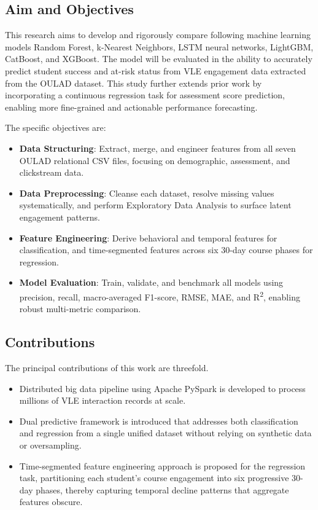 \documentclass[conference]{IEEEtran}
\begin{document}
\subsection{Aim and Objectives}
This research aims to develop and rigorously compare following machine learning models Random Forest, k-Nearest Neighbors, LSTM neural networks, LightGBM, CatBoost, and XGBoost. The model will be evaluated in the ability to accurately predict student success and at-risk status from VLE engagement data extracted from the OULAD dataset. This study further extends prior work by incorporating a continuous regression task for assessment score prediction, enabling more fine-grained and actionable performance forecasting.

The specific objectives are:
\begin{itemize}
    \item \textbf{Data Structuring}: Extract, merge, and engineer features from all seven OULAD relational CSV files, focusing on demographic, assessment, and clickstream data.
    \item \textbf{Data Preprocessing}: Cleanse each dataset, resolve missing values systematically, and perform Exploratory Data Analysis to surface latent engagement patterns.
    \item \textbf{Feature Engineering}: Derive behavioral and temporal features for classification, and time-segmented features across six 30-day course phases for regression.
    \item \textbf{Model Evaluation}: Train, validate, and benchmark all models using precision, recall, macro-averaged F1-score, RMSE, MAE, and R\textsuperscript{2}, enabling robust multi-metric comparison.
\end{itemize}

\subsection{Contributions}
The principal contributions of this work are threefold.

\begin{itemize}
    \item Distributed big data pipeline using Apache PySpark is developed to process millions of VLE interaction records at scale.
    \item Dual predictive framework is introduced that addresses both classification and regression from a single unified dataset without relying on synthetic data or oversampling.
    \item Time-segmented feature engineering approach is proposed for the regression task, partitioning each student's course engagement into six progressive 30-day phases, thereby capturing temporal decline patterns that aggregate features obscure.
\end{itemize}
\end{document}
